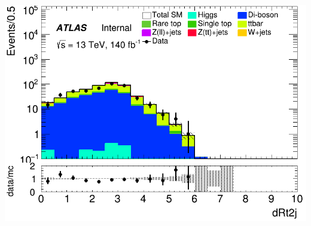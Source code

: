 \documentclass[usenames,dvipsnames]{beamer}
\begin{document}
\begin{frame}
\begin{minipage}{0.32\textwidth}
        \includegraphics[width=\textwidth]{graphics/LLH_met/LLH_met_dRt2j.png}
    \end{minipage}
    
    \vspace{0.5cm} %


\end{frame}
\end{document}
